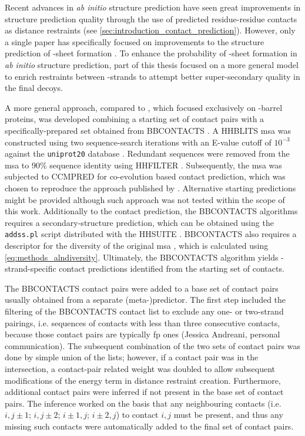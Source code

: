 Recent advances in \textit{ab initio} structure prediction have seen great improvements in structure prediction quality through the use of predicted residue-residue contacts as distance restraints (see \cref{sec:introduction_contact_prediction}). However, only a single paper has specifically focused on improvements to the structure prediction of \textbeta-sheet formation \cite{Hayat2015-ut}. To enhance the probability of \textbeta-sheet formation in \textit{ab initio} structure prediction, part of this thesis focused on a more general model to enrich restraints between \textbeta-strands to attempt better super-secondary quality in the final decoys.

A more general approach, compared to \textcite{Hayat2015-ut}, which focused exclusively on \textbeta-barrel proteins, was developed combining a starting set of contact pairs with a specifically-prepared set obtained from BBCONTACTS \cite{Andreani2015-qn}. A HHBLITS \cite{Remmert2011-kt} \gls{msa} was constructed using two sequence-search iterations with an E-value cutoff of $10^{-3}$ against the \texttt{uniprot20} database \cite{Bateman2017-pb}. Redundant sequences were removed from the \gls{msa} to 90\% sequence identity using HHFILTER \cite{Remmert2011-kt}. Subsequently, the \gls{msa} was subjected to CCMPRED \cite{Seemayer2014-zp} for co-evolution based contact prediction, which was chosen to reproduce the approach published by \textcite{Andreani2015-qn}. Alternative starting predictions might be provided although such approach was not tested within the scope of this work. Additionally to the contact prediction, the BBCONTACTS algorithms requires a secondary-structure prediction, which can be obtained using the \texttt{addss.pl} script \cite{Remmert2011-kt} distributed with the HHSUITE \cite{Soding2005-hw}. BBCONTACTS also requires a descriptor for the diversity of the original \gls{msa} \cite{Andreani2015-qn}, which is calculated using \cref{eq:methods_alndiversity}. Ultimately, the BBCONTACTS algorithm yields \textbeta-strand-specific contact predictions identified from the starting set of contacts.

The BBCONTACTS contact pairs were added to a base set of contact pairs usually obtained from a separate (meta-)predictor. The first step included the filtering of the BBCONTACTS contact list to exclude any one- or two-strand pairings, i.e. sequences of contacts with less than three consecutive contacts, because those contact pairs are typically \gls{fp} ones (Jessica Andreani, personal communication). The subsequent combination of the two sets of contact pairs was done by simple union of the lists; however, if a contact pair was in the intersection, a contact-pair related weight was doubled to allow subsequent modifications of the energy term in distance restraint creation. Furthermore, additional contact pairs were inferred if not present in the base set of contact pairs. The inference worked on the basis that any neighbouring contacts (i.e. $i,j\pm1$; $i,j\pm2$; $i\pm  1,j$; $i\pm2,j$) to contact $i,j$ must be present, and thus any missing such contacts were automatically added to the final set of contact pairs. 

